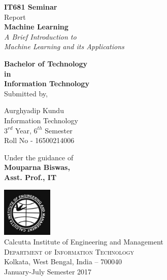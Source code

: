\begin{titlepage}

\begin{center}

\textup{\small {\bf IT681 Seminar} \\ Report}\\[0.2in]

\Large \textbf {Machine Learning}\\[0.5in]

       \small \emph{A Brief Introduction to\\
        Machine Learning and its Applications}
        \vspace{.2in}

       {\bf Bachelor of Technology \\in\\ Information Technology}\\[0.5in]

\normalsize Submitted by, \\
\begin{center}
Aurghyadip Kundu \\
Information Technology\\
$3^{rd}$ Year, $6^{th}$ Semester\\
Roll No - 16500214006
\end{center}
\vspace{.1in}
Under the guidance of\\
{\textbf{Mouparna Biswas,\\Asst. Prof., IT}}\\[0.2in]

\vfill

\includegraphics[width=0.18\textwidth]{ciem-logo.jpg}\\[0.1in]
\Large{Calcutta Institute of Engineering and Management}\\
\normalsize
\textsc{Department of Information Technology}\\
Kolkata, West Bengal, India -- 700040 \\
\vspace{0.2cm}
January-July Semester 2017

\end{center}

\end{titlepage}
